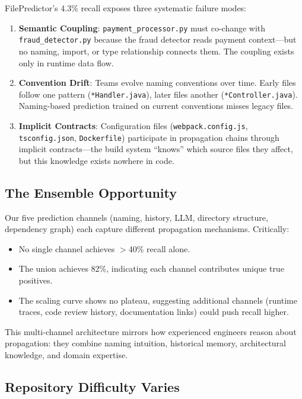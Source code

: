 \documentclass[sigconf,nonacm]{acmart}
\begin{document}
FilePredictor's 4.3\% recall exposes three systematic failure modes:

\begin{enumerate}
    \item \textbf{Semantic Coupling}: \texttt{payment\_processor.py} must co-change with \texttt{fraud\_detector.py} because the fraud detector reads payment context---but no naming, import, or type relationship connects them. The coupling exists only in runtime data flow.
    
    \item \textbf{Convention Drift}: Teams evolve naming conventions over time. Early files follow one pattern (\texttt{*Handler.java}), later files another (\texttt{*Controller.java}). Naming-based prediction trained on current conventions misses legacy files.
    
    \item \textbf{Implicit Contracts}: Configuration files (\texttt{webpack.config.js}, \texttt{tsconfig.json}, \texttt{Dockerfile}) participate in propagation chains through implicit contracts---the build system ``knows'' which source files they affect, but this knowledge exists nowhere in code.
\end{enumerate}

\subsection{The Ensemble Opportunity}

Our five prediction channels (naming, history, LLM, directory structure, dependency graph) each capture different propagation mechanisms. Critically:
\begin{itemize}
    \item No single channel achieves $>$40\% recall alone.
    \item The union achieves 82\%, indicating each channel contributes unique true positives.
    \item The scaling curve shows no plateau, suggesting additional channels (runtime traces, code review history, documentation links) could push recall higher.
\end{itemize}

This multi-channel architecture mirrors how experienced engineers reason about propagation: they combine naming intuition, historical memory, architectural knowledge, and domain expertise.

\subsection{Repository Difficulty Varies}
\end{document}
